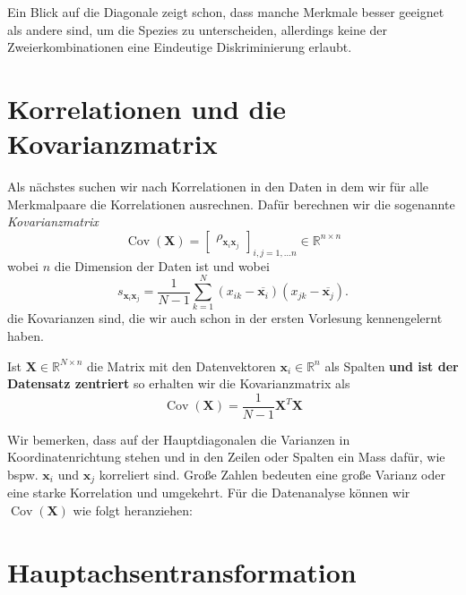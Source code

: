 \documentclass[]{book}
\theoremstyle{definition}
\theoremstyle{definition}
\theoremstyle{definition}
\theoremstyle{definition}
\theoremstyle{remark}
\begin{document}
Ein Blick auf die Diagonale zeigt schon, dass manche Merkmale besser geeignet als andere sind, um die Spezies zu unterscheiden, allerdings keine der Zweierkombinationen eine Eindeutige Diskriminierung erlaubt.

\hypertarget{korrelationen-und-die-kovarianzmatrix}{%
\section{Korrelationen und die Kovarianzmatrix}\label{korrelationen-und-die-kovarianzmatrix}}

Als nächstes suchen wir nach Korrelationen in den Daten in dem wir für alle Merkmalpaare die Korrelationen ausrechnen. Dafür berechnen wir die sogenannte \emph{Kovarianzmatrix}
\begin{equation*}
\operatorname{Cov}(\mathbf X) = \begin{bmatrix}
\rho_{{\mathbf{x} _ i \mathbf{x} _ j}}
\end{bmatrix}_{i,j=1,\dots n} \in \mathbb R^{n\times n}
\end{equation*}
wobei \(n\) die Dimension der Daten ist und wobei
\begin{equation*}
s_{{\mathbf{x} _ i \mathbf{x} _ j}} = \frac{1}{N-1} \sum_{k=1}^N (x_{ik}-\overline{{\mathbf{x} _ i}})(x_{jk}-\overline{{\mathbf{x} _ j}} ).
\end{equation*}
die Kovarianzen sind, die wir auch schon in der ersten Vorlesung kennengelernt haben.

Ist \(\mathbf X\in \mathbb R^{N\times n}\) die Matrix mit den Datenvektoren \({\mathbf{x} _ i}\in \mathbb R^{n}\) als Spalten \textbf{und ist der Datensatz zentriert} so erhalten wir die Kovarianzmatrix als
\begin{equation*}
\operatorname{Cov}({\mathbf{X}}) = \frac{1}{N-1}{\mathbf{X}}^T {\mathbf{X}}
\end{equation*}

Wir bemerken, dass auf der Hauptdiagonalen die Varianzen in Koordinatenrichtung stehen und in den Zeilen oder Spalten ein Mass dafür, wie bspw. \({\mathbf{x} _ i}\) und \({\mathbf{x} _ j}\) korreliert sind. Große Zahlen bedeuten eine große Varianz oder eine starke Korrelation und umgekehrt. Für die Datenanalyse können wir \(\operatorname{Cov}({\mathbf{X}})\) wie folgt heranziehen:

\hypertarget{hauptachsentransformation}{%
\section{Hauptachsentransformation}\label{hauptachsentransformation}}
\end{document}
